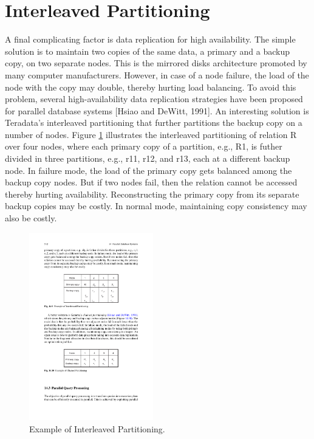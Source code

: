\documentclass{vldb}
\begin{document}
\section{Interleaved Partitioning}
A final complicating factor is data replication for high availability. The simple solution is to maintain two copies of the same data, a primary and a backup copy, on two separate nodes. This is the mirrored disks architecture promoted by many computer manufacturers. However, in case of a node failure, the load of the node with the copy may double, thereby hurting load balancing. To avoid this problem, several high-availability data replication strategies have been proposed for parallel database systems [Hsiao and DeWitt, 1991]. An interesting solution is Teradata’s interleaved partitioning that further partitions the backup copy on a number of nodes. Figure \ref{fig:interleaved} illustrates the interleaved partitioning of relation R over four nodes, where each primary copy of a partition, e.g., R1, is futher divided in three partitions, e.g., r11, r12, and r13, each at a different backup node. 
In failure mode, the load of the primary copy gets balanced among the backup copy nodes. But if two nodes fail, then the relation cannot be accessed thereby hurting availability. Reconstructing the primary copy from its separate backup copies may be costly. In normal mode, maintaining copy consistency may also be costly.
\begin{figure}[htb]
\centering
\includegraphics[width=0.48\textwidth]{interleaved}
\caption{Example of Interleaved Partitioning.}
\label{fig:interleaved}
\end{figure}
\end{document}
